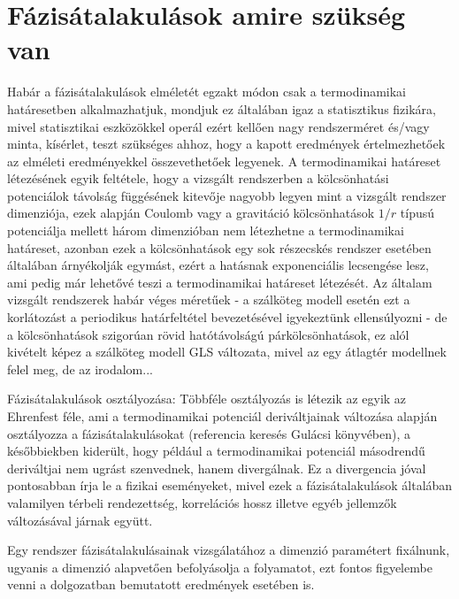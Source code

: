 \section{Fázisátalakulások amire szükség van}

Habár a fázisátalakulások elméletét egzakt módon csak a termodinamikai határesetben alkalmazhatjuk, mondjuk ez általában igaz a statisztikus fizikára, mivel statisztikai eszközökkel operál ezért kellően nagy rendszerméret és/vagy minta, kísérlet, teszt szükséges ahhoz, hogy a kapott eredmények értelmezhetőek az elméleti eredményekkel összevethetőek legyenek. A termodinamikai határeset létezésének egyik feltétele, hogy a vizsgált rendszerben a kölcsönhatási potenciálok távolság függésének kitevője nagyobb legyen mint a vizsgált rendszer dimenziója, ezek alapján Coulomb vagy a gravitáció kölcsönhatások $1/r$ típusú potenciálja mellett három dimenzióban nem létezhetne a termodinamikai határeset, azonban ezek a kölcsönhatások egy sok részecskés rendszer esetében általában árnyékolják egymást, ezért a hatásnak exponenciális lecsengése lesz, ami pedig már lehetővé teszi a termodinamikai határeset létezését. Az általam vizsgált rendszerek habár véges méretűek - a szálköteg modell esetén ezt a korlátozást a periodikus határfeltétel bevezetésével igyekeztünk ellensúlyozni - de a kölcsönhatások szigorúan rövid hatótávolságú párkölcsönhatások, ez alól kivételt képez a szálköteg modell GLS változata, mivel az egy átlagtér modellnek felel meg, de az irodalom...

Fázisátalakulások osztályozása:
Többféle osztályozás is létezik az egyik az Ehrenfest féle, ami a termodinamikai potenciál deriváltjainak változása alapján osztályozza a fázisátalakulásokat (referencia keresés Gulácsi könyvében), a későbbiekben kiderült, hogy például a termodinamikai potenciál másodrendű deriváltjai nem ugrást szenvednek, hanem divergálnak. Ez a divergencia jóval pontosabban írja le a fizikai eseményeket, mivel ezek a fázisátalakulások általában valamilyen térbeli rendezettség, korrelációs hossz illetve egyéb jellemzők változásával járnak együtt.

Egy rendszer fázisátalakulásainak vizsgálatához a dimenzió paramétert fixálnunk, ugyanis a dimenzió alapvetően befolyásolja a folyamatot, ezt fontos figyelembe venni a dolgozatban bemutatott eredmények esetében is. 




